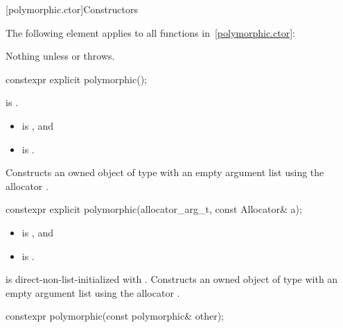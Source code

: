 [polymorphic.ctor]{Constructors}

\pnum
The following element applies to all functions in~\ref{polymorphic.ctor}:

\begin{itemdescr}
\pnum
\throws
Nothing unless  or
 throws.
\end{itemdescr}

%
\begin{itemdecl}
constexpr explicit polymorphic();
\end{itemdecl}

\begin{itemdescr}
\pnum
\constraints
{} is .

\pnum
\mandates
\begin{itemize}
\item
{} is , and
\item
{} is .
\end{itemize}

\pnum
\effects
Constructs an owned object of type  with an empty argument list
using the allocator .
\end{itemdescr}

%
\begin{itemdecl}
constexpr explicit polymorphic(allocator_arg_t, const Allocator& a);
\end{itemdecl}

\begin{itemdescr}
\pnum
\mandates
\begin{itemize}
\item
{} is , and
\item
{} is .
\end{itemize}

\pnum
\effects
{} is direct-non-list-initialized with .
Constructs an owned object of type  with an empty argument list
using the allocator .
\end{itemdescr}

%
\begin{itemdecl}
constexpr polymorphic(const polymorphic& other);
\end{itemdecl}

